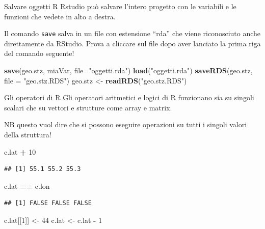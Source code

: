 \documentclass[
  ignorenonframetext,
]{beamer}
\newenvironment{Shaded}{\begin{snugshade}}{\end{snugshade}}
\newcommand{\AttributeTok}[1]{\textcolor[rgb]{0.13,0.29,0.53}{#1}}
\newcommand{\DecValTok}[1]{\textcolor[rgb]{0.00,0.00,0.81}{#1}}
\newcommand{\FunctionTok}[1]{\textcolor[rgb]{0.13,0.29,0.53}{\textbf{#1}}}
\newcommand{\NormalTok}[1]{#1}
\newcommand{\OtherTok}[1]{\textcolor[rgb]{0.56,0.35,0.01}{#1}}
\newcommand{\SpecialCharTok}[1]{\textcolor[rgb]{0.81,0.36,0.00}{\textbf{#1}}}
\newcommand{\StringTok}[1]{\textcolor[rgb]{0.31,0.60,0.02}{#1}}
\begin{document}
\begin{frame}[fragile]{Salvare oggetti R}
\protect\hypertarget{salvare-oggetti-r}{}
Rstudio può salvare l'intero progetto con le variabili e le funzioni che
vedete in alto a destra.

Il comando \texttt{save} salva in un file con estensione ``rda'' che
viene riconosciuto anche direttamente da RStudio. Prova a cliccare sul
file dopo aver lanciato la prima riga del comando seguente!

\begin{Shaded}
\begin{Highlighting}[]
\FunctionTok{save}\NormalTok{(geo.stz, miaVar, }\AttributeTok{file=}\StringTok{"oggetti.rda"}\NormalTok{)}
\FunctionTok{load}\NormalTok{(}\StringTok{"oggetti.rda"}\NormalTok{)}
\FunctionTok{saveRDS}\NormalTok{(geo.stz, }\AttributeTok{file =} \StringTok{"geo.stz.RDS"}\NormalTok{) }
\NormalTok{geo.stz }\OtherTok{\textless{}{-}} \FunctionTok{readRDS}\NormalTok{(}\StringTok{"geo.stz.RDS"}\NormalTok{)}
\end{Highlighting}
\end{Shaded}
\end{frame}

\begin{frame}[fragile]{Gli operatori di R}
\protect\hypertarget{sec-gli-operatori-di-r}{}
Gli operatori aritmetici e logici di R funzionano sia su singoli scalari
che su vettori e strutture come array e matrix.

NB questo vuol dire che si possono eseguire operazioni su tutti i
singoli valori della struttura!

\begin{Shaded}
\begin{Highlighting}[]
\NormalTok{c.lat }\SpecialCharTok{+} \DecValTok{10}
\end{Highlighting}
\end{Shaded}

\begin{verbatim}
## [1] 55.1 55.2 55.3
\end{verbatim}

\begin{Shaded}
\begin{Highlighting}[]
\NormalTok{c.lat }\SpecialCharTok{==}\NormalTok{ c.lon}
\end{Highlighting}
\end{Shaded}

\begin{verbatim}
## [1] FALSE FALSE FALSE
\end{verbatim}

\begin{Shaded}
\begin{Highlighting}[]
\NormalTok{c.lat[[}\DecValTok{1}\NormalTok{]] }\OtherTok{\textless{}{-}} \DecValTok{44}
\NormalTok{c.lat }\OtherTok{\textless{}{-}}\NormalTok{ c.lat }\SpecialCharTok{{-}} \DecValTok{1}
\end{Highlighting}
\end{Shaded}
\end{frame}
\end{document}
